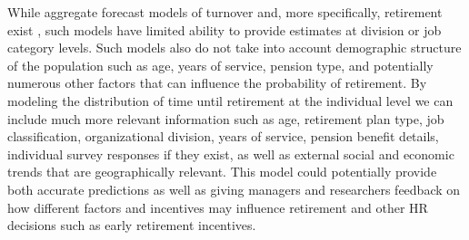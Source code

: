 \documentclass[12pt,letterpaper]{article}
\begin{document}
While aggregate forecast models of turnover and, more specifically, retirement exist \citep{zhu2015}, such models have limited ability to provide estimates at division or job category levels.  Such models also do not take into account demographic structure of the population such as age, years of service, pension type, and potentially numerous other factors that can influence the probability of retirement. By modeling the distribution of time until retirement at the individual level we can include much more relevant information such as age, retirement plan type, job classification, organizational division, years of service, pension benefit details, individual survey responses if they exist, as well as external social and economic trends that are geographically relevant. This model could potentially provide both accurate predictions as well as giving managers and researchers feedback on how different factors and incentives may influence retirement and other HR decisions such as early retirement incentives.





\end{document}
